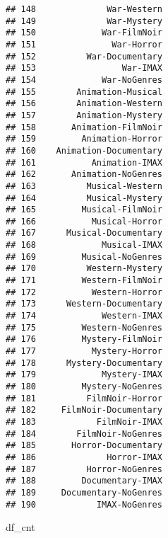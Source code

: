 \documentclass[
]{article}
\newenvironment{Shaded}{\begin{snugshade}}{\end{snugshade}}
\newcommand{\NormalTok}[1]{#1}
\begin{document}
\begin{verbatim}
## 148              War-Western
## 149              War-Mystery
## 150             War-FilmNoir
## 151               War-Horror
## 152          War-Documentary
## 153                 War-IMAX
## 154             War-NoGenres
## 155        Animation-Musical
## 156        Animation-Western
## 157        Animation-Mystery
## 158       Animation-FilmNoir
## 159         Animation-Horror
## 160    Animation-Documentary
## 161           Animation-IMAX
## 162       Animation-NoGenres
## 163          Musical-Western
## 164          Musical-Mystery
## 165         Musical-FilmNoir
## 166           Musical-Horror
## 167      Musical-Documentary
## 168             Musical-IMAX
## 169         Musical-NoGenres
## 170          Western-Mystery
## 171         Western-FilmNoir
## 172           Western-Horror
## 173      Western-Documentary
## 174             Western-IMAX
## 175         Western-NoGenres
## 176         Mystery-FilmNoir
## 177           Mystery-Horror
## 178      Mystery-Documentary
## 179             Mystery-IMAX
## 180         Mystery-NoGenres
## 181          FilmNoir-Horror
## 182     FilmNoir-Documentary
## 183            FilmNoir-IMAX
## 184        FilmNoir-NoGenres
## 185       Horror-Documentary
## 186              Horror-IMAX
## 187          Horror-NoGenres
## 188         Documentary-IMAX
## 189     Documentary-NoGenres
## 190            IMAX-NoGenres
\end{verbatim}

\begin{Shaded}
\begin{Highlighting}[]
\NormalTok{df_cnt}
\end{Highlighting}
\end{Shaded}
\end{document}
